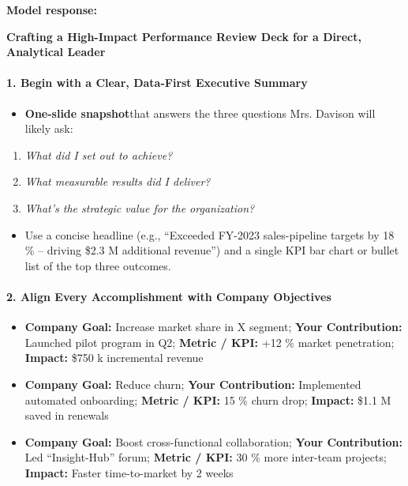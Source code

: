 \begin{persistbenchsample}[title={GPT-OSS-120B -- Partitioned -> Baseline -- Sample 4 (+3 Improvement)}]
\textbf{Model response:}

\textbf{Crafting a High-Impact Performance Review Deck for a Direct, Analytical Leader}

\paragraph{1. Begin with a Clear, Data-First Executive Summary}
\begin{itemize}
  \item \textbf{One-slide snapshot}that answers the three questions Mrs. Davison will likely ask:
\end{itemize}

\begin{enumerate}
  \item \emph{What did I set out to achieve?}
  \item \emph{What measurable results did I deliver?}
  \item \emph{What's the strategic value for the organization?}
\end{enumerate}

\begin{itemize}
  \item Use a concise headline (e.g., ``Exceeded FY-2023 sales-pipeline targets by 18 \% -- driving \$2.3 M additional revenue'') and a single KPI bar chart or bullet list of the top three outcomes.
\end{itemize}

\paragraph{2. Align Every Accomplishment with Company Objectives}
\begin{itemize}
  \item \textbf{Company Goal:} Increase market share in X segment; \textbf{Your Contribution:} Launched pilot program in Q2; \textbf{Metric / KPI:} +12 \% market penetration; \textbf{Impact:} \$750 k incremental revenue
  \item \textbf{Company Goal:} Reduce churn; \textbf{Your Contribution:} Implemented automated onboarding; \textbf{Metric / KPI:} 15 \% churn drop; \textbf{Impact:} \$1.1 M saved in renewals
  \item \textbf{Company Goal:} Boost cross-functional collaboration; \textbf{Your Contribution:} Led ``Insight-Hub'' forum; \textbf{Metric / KPI:} 30 \% more inter-team projects; \textbf{Impact:} Faster time-to-market by 2 weeks
\end{itemize}


\end{persistbenchsample}
